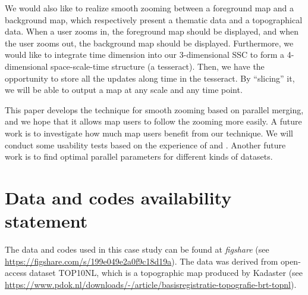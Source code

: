 \documentclass[]{interact}
\begin{document}
We would also like to realize smooth zooming
between a foreground map and a background map,
which respectively present a thematic data and a topographical data.
When a user zooms in, the foreground map should be displayed,
and when the user zooms out,
the background map should be displayed.
Furthermore, we would like to 
integrate time dimension into our 3-dimensional SSC
to form a 4-dimensional space-scale-time structure (a tesseract).
Then, we have the opportunity to store all the updates along time in the tesseract.
By ``slicing'' it, we will be able to output a map at any scale and any time point.


This paper develops the technique for smooth zooming based on parallel merging,
and we hope that it allows map users to follow the zooming more easily.
A future work is to investigate 
how much map users benefit from our technique.
We will conduct some usability tests based on the experience of
\citet[]{Suba2017Thesis} and \citet{Midtbo2007}.
Another future work is to find optimal parallel parameters for 
different kinds of datasets.















\section*{Data and codes availability statement}

The data and codes used in this case study 
can be found at \emph{figshare} 
(see \url{https://figshare.com/s/199e049e2a0f9c18d19a}).
The data was derived from open-access dataset TOP10NL,
which is a topographic map produced by Kadaster
(see \url{https://www.pdok.nl/downloads/-/article/basisregistratie-topografie-brt-topnl}).
\end{document}
